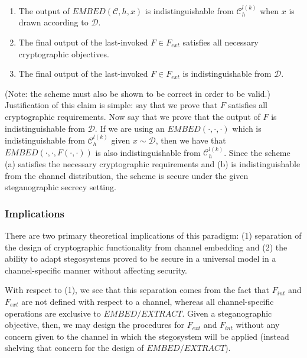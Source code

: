 \documentclass{article}
\begin{document}
\begin{enumerate}
\item{The output of $EMBED(\mathcal{C}, h, x)$ is indistinguishable from $\mathcal{C}_h^{l(k)}$ when $x$ is drawn according to $\mathcal{D}$.}
\item{The final output of the last-invoked $F \in F_{ext}$ satisfies all necessary cryptographic objectives.}
\item{The final output of the last-invoked $F \in F_{ext}$ is indistinguishable from $\mathcal{D}$.} 
\end{enumerate}

\noindent (Note: the scheme must also be shown to be correct in order to be valid.)
\newline\newline
Justification of this claim is simple: say that we prove that $F$ satisfies all cryptographic requirements.  Now say that 
we prove that the output of $F$ is indistinguishable from $\mathcal{D}$.  If we are using an $EMBED(\cdot,\cdot,\cdot)$ which is 
indistinguishable from $\mathcal{C}_h^{l(k)}$ given $x \sim \mathcal{D}$, then we have that $EMBED(\cdot,\cdot,F(\cdot,\cdot))$ is 
also indistinguishable from $\mathcal{C}_h^{l(k)}$.  Since the scheme (a) satisfies the necessary cryptographic requirements and 
(b) is indistinguishable from the channel distribution, the scheme is secure under the given steganographic secrecy setting.

\subsubsection{Implications}

There are two primary theoretical implications of this paradigm: (1) separation of the design of cryptographic functionality from 
channel embedding and (2) the ability to adapt stegosystems proved to be secure in a universal model in a channel-specific manner 
without affecting security.

With respect to (1), we see that this separation comes from the fact that $F_{int}$ and $F_{ext}$ are not defined with respect to a channel,
whereas all channel-specific operations are exclusive to $EMBED/EXTRACT$.  Given a steganographic objective, then, we may design the 
procedures for $F_{ext}$ and $F_{int}$ without any concern given to the channel in which the stegosystem will be applied (instead shelving 
that concern for the design of $EMBED/EXTRACT$).
\end{document}
